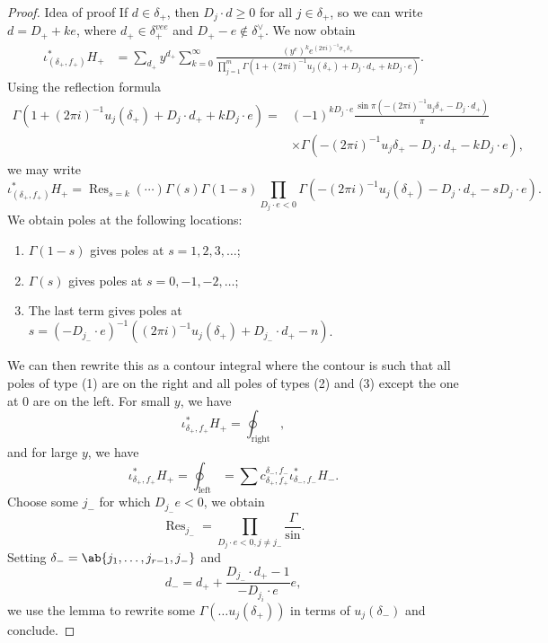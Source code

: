 \documentclass[leqno, openany]{memoir}
\theoremstyle{definition}
\theoremstyle{remark}
\theoremstyle{plain}
\theoremstyle{definition}
\theoremstyle{remark}
\newcommand{\mr}[1]{\mathrm{#1}}
\newcommand{\on}[1]{\operatorname{#1}}
\begin{document}
\begin{proof}{Idea of proof}
    If $d \in \delta_+$, then $D_j \cdot d \geq 0$ for all $j \in \delta_+$, so we can write $d = D_+ + k e$, where $d_+ \in \delta_+^{vee}$ and $D_+ - e \notin \delta_+^{\vee}$. We now obtain
    \begin{align*}
        \iota^*_{(\delta_+, f_+)} H_+ &= \sum_{d_+} y^{d_+} \sum_{k = 0}^{\infty} \frac{(y^e)^k e^{(2\pi i)^{-1} \sigma_+ \delta_+}}{\prod_{j=1}^m \Gamma(1+(2\pi i)^{-1} u_j(\delta_+) + D_j \cdot d_+ + k D_j \cdot e)}.
    \end{align*}
    Using the reflection formula
    \begin{align*}
        \Gamma(1+(2\pi i)^{-1}u_j(\delta_+) + D_j \cdot d_+ + k D_j \cdot e) =&{} (-1)^{k D_j \cdot e} \frac{\sin \pi(-(2\pi i)^{-1} u_j \delta_+ - D_j \cdot d_+)}{\pi} \\ &\times \Gamma(-(2\pi i)^{-1} u_j \delta_+ - D_j \cdot d_+ - k D_j \cdot e), 
    \end{align*}
    we may write
    \[ \iota_{(\delta_+, f_+)}^* H_+ = \on{Res}_{s=k}(\cdots) \Gamma(s) \Gamma(1-s)\prod_{D_j \cdot e < 0} \Gamma(-(2\pi i)^{-1} u_j(\delta_+) - D_j \cdot d_+ - s D_j \cdot e). \]
    We obtain poles at the following locations:
    \begin{enumerate}[(1)]
        \item $\Gamma(1-s)$ gives poles at $s=1,2,3,\ldots$;
        \item $\Gamma(s)$ gives poles at $s=0,-1,-2,\ldots$;
        \item The last term gives poles at $s=(-D_{j_-} \cdot e)^{-1} ((2\pi i)^{-1} u_j(\delta_+) + D_{j_-} \cdot d_+ - n)$.
    \end{enumerate}
    We can then rewrite this as a contour integral where the contour is such that all poles of type (1) are on the right and all poles of types (2) and (3) except the one at $0$ are on the left. For small $y$, we have
    \[ \iota_{\delta_+, f_+}^* H_+ = \oint_{\mr{right}}, \]
    and for large $y$, we have
    \[ \iota_{\delta_+, f_+}^* H_+ = \oint_{\mr{left}} = \sum c_{\delta_+, f_+}^{\delta_-, f_-} \iota_{\delta_-, f_-}^* H_-. \]
    Choose some $j_-$ for which $D_{j_-} e < 0$, we obtain
    \[ \on{Res}_{j_-} = \prod_{D_j \cdot e < 0, j \neq j_-} \frac{\Gamma}{\sin}. \]
    Setting $\delta_- = \ab\{j_1, \ldots, j_{r-1}, j_- \}$ and 
    \[ d_- = d_+ + \frac{D_{j_-} \cdot d_+ - 1}{- D_{j_i} \cdot e} e, \]
    we use the lemma to rewrite some $\Gamma(\ldots u_j(\delta_+))$ in terms of $u_j(\delta_-)$ and conclude.
\end{proof}
\end{document}
